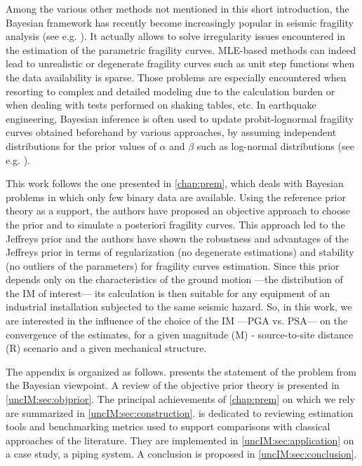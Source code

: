 Among the various other methods not mentioned in this short introduction, the Bayesian framework has recently become increasingly popular in seismic fragility analysis (see e.g. \cite{gardoni_probabilistic_2002,wang_seismic_2018,katayama_bayesian-estimation-based_2021,koutsourelakis_assessing_2010,damblin_approche_2014,tadinada_structural_2017,kwag_computationally_2018,jeon_parameterized_2019,tabandeh_physics-based_2020}). 
It actually allows to solve irregularity issues encountered in the estimation of the parametric fragility curves. MLE-based methods can indeed lead to unrealistic or degenerate fragility curves such as unit step functions when the data availability is sparse. Those problems are especially encountered when resorting to complex and detailed modeling due to the calculation burden or when dealing with tests performed on shaking tables, etc. In earthquake engineering, Bayesian inference is often used to update probit-lognormal fragility curves obtained beforehand by various approaches, by assuming independent distributions for the prior values of $\alpha$ and $\beta$ such as log-normal distributions (see e.g. \cite{tadinada_structural_2017,kwag_computationally_2018,wang_seismic_2018,katayama_bayesian-estimation-based_2021,straub_improved_2008}).

This work follows the one presented in \cref{chap:prem}, which deals with Bayesian problems in which only few binary data are available. Using the reference prior theory as a support, the authors have proposed an objective approach to choose the prior and to simulate a posteriori fragility curves. This approach led to the Jeffreys prior and the authors have shown the robustness and advantages of the Jeffreys prior in terms of regularization (no degenerate estimations) and stability (no outliers of the parameters) for fragility curves estimation. Since this prior depends only on the characteristics of the ground motion ---the distribution of the IM of interest--- its calculation is then suitable for any equipment of an industrial installation subjected to the same seismic hazard. So, in this work, we are interested in the influence of the choice of the IM ---PGA vs. PSA--- on the convergence of the estimates, for a given magnitude (M) - source-to-site distance (R) scenario and a given mechanical structure.

The appendix is organized as follows.  presents the statement of the problem from the Bayesian viewpoint. A review of the objective prior theory is presented in \cref{uncIM:sec:objprior}. The principal achievements of \cref{chap:prem} on which we rely are summarized in \cref{uncIM:sec:construction}.  is dedicated to reviewing estimation tools and benchmarking metrics used to support comparisons with classical approaches of the literature. They are implemented in \cref{uncIM:sec:application} on a case study, a piping system. A conclusion is proposed in \cref{uncIM:sec:conclusion}.





